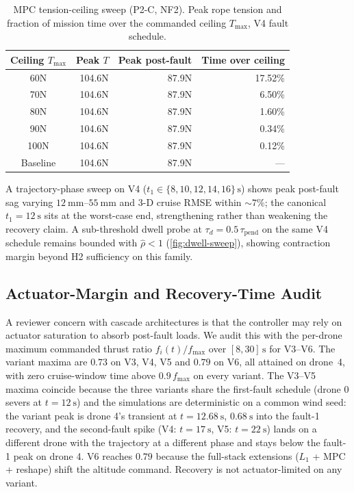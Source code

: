 \begin{table}[htbp]
  \caption{MPC tension-ceiling sweep (P2-C, NF2). Peak rope tension and fraction of mission time over the commanded ceiling $T_{\max}$, V4 fault schedule.}
  \label{tab:mpc-ceiling-sweep}
  \centering
  \small
  \renewcommand{\arraystretch}{1.05}
  \begin{tabular}{crrr}
    \toprule
    Ceiling $T_{\max}$ & Peak $T$ & Peak post-fault & Time over ceiling \\
    \midrule
    60N       & 104.6N & 87.9N & 17.52\% \\
    70N       & 104.6N & 87.9N & 6.50\%  \\
    80N       & 104.6N & 87.9N & 1.60\%  \\
    90N       & 104.6N & 87.9N & 0.34\%  \\
    100N      & 104.6N & 87.9N & 0.12\%  \\
    Baseline & 104.6N & 87.9N & ---   \\
    \bottomrule
  \end{tabular}
\end{table}

A trajectory-phase sweep on V4 ($t_1\in\{8,10,12,14,16\}\,\si{\second}$) shows peak post-fault sag varying $\SI{12}{\milli\metre}$--$\SI{55}{\milli\metre}$ and 3-D cruise RMSE within $\sim 7\%$; the canonical $t_1=\SI{12}{\second}$ sits at the worst-case end, strengthening rather than weakening the recovery claim. A sub-threshold dwell probe at $\tau_d=0.5\,\tau_{\mathrm{pend}}$ on the same V4 schedule remains bounded with $\hat\rho<1$ (\cref{fig:dwell-sweep}), showing contraction margin beyond H2 sufficiency on this family.

\subsection{Actuator-Margin and Recovery-Time Audit}
\label{sec:VI-actuator-recovery}

A reviewer concern with cascade architectures is that the controller may rely on actuator saturation to absorb post-fault loads. We audit this with the per-drone maximum commanded thrust ratio $f_i(t)/f_{\max}$ over $[8,30]\,\si{\second}$ for V3--V6. The variant maxima are $0.73$ on V3, V4, V5 and $0.79$ on V6, all attained on drone~4, with zero cruise-window time above $0.9\,f_{\max}$ on every variant. The V3--V5 maxima coincide because the three variants share the first-fault schedule (drone 0 severs at $t=\SI{12}{\second}$) and the simulations are deterministic on a common wind seed: the variant peak is drone 4's transient at $t=\SI{12.68}{\second}$, $\SI{0.68}{\second}$ into the fault-1 recovery, and the second-fault spike (V4: $t=\SI{17}{\second}$, V5: $t=\SI{22}{\second}$) lands on a different drone with the trajectory at a different phase and stays below the fault-1 peak on drone 4. V6 reaches $0.79$ because the full-stack extensions ($L_1$ + MPC + reshape) shift the altitude command. Recovery is not actuator-limited on any variant.

